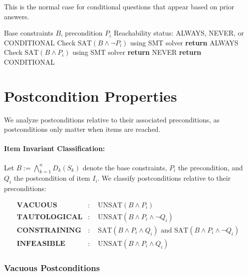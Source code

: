 This is the normal case for conditional questions that appear based on prior answers.

\begin{algorithm}[H]
\caption{Precondition Reachability Classification}
\label{alg:precondition-classify}
\begin{algorithmic}[1]
\Require Base constraints $B$, precondition $P_i$
\Ensure Reachability status: ALWAYS, NEVER, or CONDITIONAL
\State Check $\mathrm{SAT}(B \wedge \neg P_i)$ using SMT solver
    \State \textbf{return} ALWAYS 
\EndIf
\State Check $\mathrm{SAT}(B \wedge P_i)$ using SMT solver
    \State \textbf{return} NEVER 
\Else
    \State \textbf{return} CONDITIONAL 
\EndIf
\end{algorithmic}
\end{algorithm}

\section{Postcondition Properties}

We analyze postconditions relative to their associated preconditions, as postconditions only matter when items are reached.

\paragraph{Item Invariant Classification:}

Let $B := \bigwedge_{k=1}^n D_k(S_k)$ denote the base constraints, $P_i$ the precondition, and $Q_i$ the postcondition of item $I_i$. We classify postconditions relative to their preconditions:

\[
\begin{aligned}
\textbf{VACUOUS} &:\quad \mathrm{UNSAT}(B \wedge P_i) \\
\textbf{TAUTOLOGICAL} &:\quad \mathrm{UNSAT}(B \wedge P_i \wedge \lnot Q_i) \\
\textbf{CONSTRAINING} &:\quad \mathrm{SAT}(B \wedge P_i \wedge Q_i) \text{ and } \mathrm{SAT}(B \wedge P_i \wedge \lnot Q_i) \\
\textbf{INFEASIBLE} &:\quad \mathrm{UNSAT}(B \wedge P_i \wedge Q_i)
\end{aligned}
\]

\subsubsection{Vacuous Postconditions}

